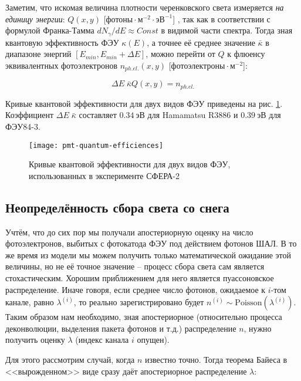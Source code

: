 Заметим, что искомая величина плотности черенковского света измеряется \textit{на единицу энергии}: $Q(x, y)$ [$\text{фотоны} \cdot \text{м}^{-2} \cdot \text{эВ}^{-1}$] \cite{Budnev2005}, так как в соответствии с формулой Франка-Тамма \cite{Tamm1939} $dN _{\gamma}/dE \approx Const$ в видимой части спектра. Тогда зная квантовую эффективность ФЭУ $\kappa(E)$, а точнее её среднее значение $\bar{\kappa}$ в диапазоне энергий $[E_{min}, E_{min} + \Delta E]$, можно перейти от $Q$ к флюенсу эквивалентных фотоэлектронов $n_{ph. el.} (x, y)$ [$\text{фотоэлектроны} \cdot \text{м}^{-2}$]:

\begin{equation}
	\Delta E \; \bar{\kappa} Q(x, y) = n_{ph. el.}
\end{equation}

Кривые квантовой эффективности для двух видов ФЭУ приведены на рис. \ref{pic:pmt-quanteffs}. Коэффициент $\Delta E \; \bar{\kappa}$ составляет $0.34~\text{эВ}$ для Hamamatsu R3886 и $0.39~\text{эВ}$ для ФЭУ84-3.

\begin{figure}[H]
	\centering
	\texttt{[image: pmt-quantum-efficiences]}
	\caption{Кривые квантовой эффективности для двух видов ФЭУ, использованных в эксперименте СФЕРА-2}
	\label{pic:pmt-quanteffs}
\end{figure}


\subsection{Неопределённость сбора света со снега}

Учтём, что до сих пор мы получали апостериорную оценку на число фотоэлектронов, выбитых с фотокатода ФЭУ под действием фотонов ШАЛ. В то же время из модели мы можем получить только математической ожидание этой величины, но не её точное значение -- процесс сбора света сам является стохастическим. Хорошим приближением для него является пуассоновское распределение. Иначе говоря, если среднее число фотонов, ожидаемое к $i$-том канале, равно $\lambda^{(i)}$, то реально зарегистрировано будет $n^{(i)} \sim \mathrm{Poisson}(\lambda^{(i)})$. Таким образом нам необходимо, зная апостериорное (относительно процесса деконволюции, выделения пакета фотонов и т.д.) распределение $n$, нужно получить оценку $\lambda$ (индекс канала $i$ опущен).

Для этого рассмотрим случай, когда $n$ известно точно. Тогда теорема Байеса в <<вырожденном>> виде сразу даёт апостериорное распределение $\lambda$:


